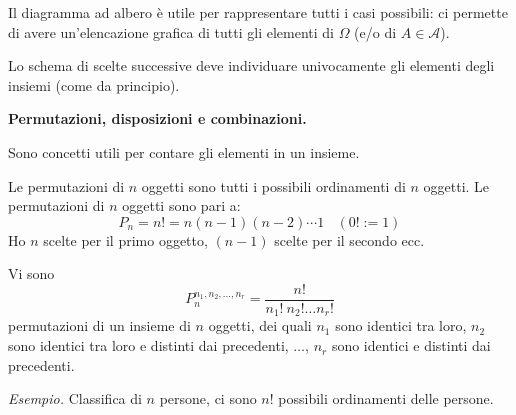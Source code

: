 
\begin{oss}
Il diagramma ad albero è utile per rappresentare tutti i casi possibili: ci permette di avere un'elencazione grafica di tutti gli elementi di $\Omega $ (e/o di $A\in \mathcal{A}$).
\end{oss}
\begin{oss}
Lo schema di scelte successive deve individuare univocamente gli elementi degli insiemi (come da principio).
\end{oss}


\textbf{Permutazioni, disposizioni e combinazioni.}

Sono concetti utili per contare gli elementi in un insieme.

\begin{definition}
Le permutazioni di $n$ oggetti sono tutti i possibili ordinamenti di $n$ oggetti. Le permutazioni di $n$ oggetti sono pari a:
\begin{equation*}
\boxed{P_{n} =n!=n( n-1)( n-2) \cdots 1} \ \ \ \ ( 0!:=1)
\end{equation*}
Ho $n$ scelte per il primo oggetto, $( n-1)$ scelte per il secondo ecc.
\end{definition}
\begin{oss}
Vi sono
\begin{equation*}
\boxed{P_{n}^{n_{1} ,n_{2} ,\dots ,n_{r}} =\frac{n!}{n_{1} !\ n_{2} !\dots n_{r} !}}
\end{equation*}
permutazioni di un insieme di $n$ oggetti, dei quali $n_{1}$ sono identici tra loro, $n_{2}$ sono identici tra loro e distinti dai precedenti, $\dots $, $n_{r}$ sono identici e distinti dai precedenti.
\end{oss}
\textit{Esempio.} Classifica di $n$ persone, ci sono $n!$ possibili ordinamenti delle persone.

